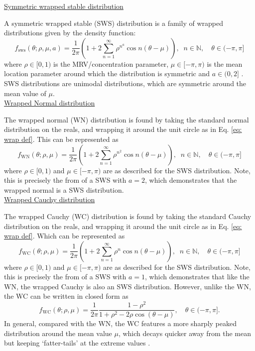 \documentclass[english]{article}
\begin{document}
\begin{appendices}
\noindent\underline{Symmetric wrapped stable distribution }

\noindent A symmetric wrapped stable (SWS) distribution is a family of wrapped distributions given by the density function:
\begin{equation}
f_{\text{sws}}(\theta;\rho,\mu,a)=\frac{1}{2\pi}\left(1+2\sum_{n=1}^{\infty}\rho^{n^a}\cos{n(\theta-\mu)}\right),\;\;n\in\mathbb{N},\quad \theta\in(-\pi,\pi]
\end{equation}
where $\rho\in[0,1)$ is the MRV/concentration parameter, $\mu\in[-\pi,\pi)$ is the mean location parameter around which the distribution is symmetric and $a\in(0,2]$ \citep{jammalamadaka2001topics,bailey2021emergence}.  SWS distributions are unimodal distributions, which are symmetric around the mean value of $\mu$.\\


\noindent\underline{Wrapped Normal distribution}

\noindent The wrapped normal (WN) distribution is found by taking the standard normal distribution on the reals, and wrapping it around the unit circle as in Eq. \ref{eq: wrap def}.  This can be represented as
\begin{equation}
f_{\text{WN}}(\theta;\rho,\mu)=\frac{1}{2\pi}\left(1+2\sum_{n=1}^{\infty}\rho^{n^2}\cos{n(\theta-\mu)}\right),\;\;n\in\mathbb{N},\quad \theta\in(-\pi,\pi]
\end{equation}
where $\rho\in[0,1)$ and $\mu\in[-\pi,\pi)$ are as described for the SWS distribution.  Note, this is precisely the from of a SWS with $a=2$, which demonstrates that the wrapped normal is a SWS distribution.\\


\noindent\underline{Wrapped Cauchy distribution}

\noindent The wrapped Cauchy (WC) distribution is found by taking the standard Cauchy distribution on the reals, and wrapping it around the unit circle as in Eq. \ref{eq: wrap def}.  Which can be represented as
\begin{equation}
f_{\text{WC}}(\theta;\rho,\mu)=\frac{1}{2\pi}\left(1+2\sum_{n=1}^{\infty}\rho^{n}\cos{n(\theta-\mu)}\right),\;\;n\in\mathbb{N},\quad \theta\in(-\pi,\pi]
\end{equation}
where $\rho\in[0,1)$ and $\mu\in[-\pi,\pi)$ are as described for the SWS distribution.  Note, this is precisely the from of a SWS with $a=1$, which demonstrates that like the WN, the wrapped Cauchy is also an SWS distribution.  However, unlike the WN, the WC can be written in closed form as
\begin{equation}
    f_{\text{WC}}(\theta;\rho,\mu)=\frac{1}{2\pi}\frac{1-\rho^2}{1+\rho^2-2\rho\cos{(\theta-\mu)}},\quad \theta\in(-\pi,\pi].
\end{equation}
In general, compared with the WN, the WC features a more sharply peaked distribution around the mean value $\mu$, which decays quicker away from the mean but keeping `fatter-tails' at the extreme values \citep{bailey2021emergence}.\\


\end{appendices}
\end{document}
